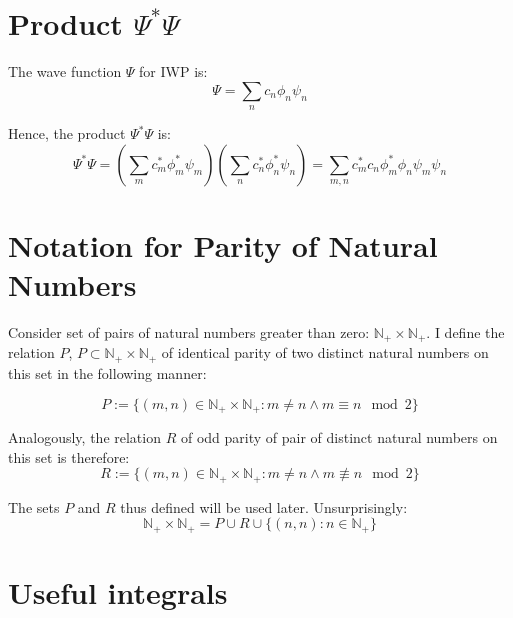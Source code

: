 \documentclass[12pt]{article}
\begin{document}
\section{Product $\Psi^* \Psi$}
The wave function $\Psi$ for IWP is:
\begin{equation*}
\Psi = \sum_n c_n \phi_n \psi_n
\end{equation*}

\noindent Hence, the product $\Psi^* \Psi$ is:
\begin{equation}
\label{qm_density_inf_sum}
\Psi^{*} \Psi = \left( 
	\sum_m c_m^* \phi_m^* \psi_m
\right) \left(
	\sum_n c_n^* \phi_n^* \psi_n
\right) = \sum_{m, n} c_m^* c_n \phi_m^* \phi_n \psi_m \psi_n
\end{equation}

\section{Notation for Parity of Natural Numbers}
Consider set of pairs of natural numbers greater than zero: $ \mathbb{N}_+ \times \mathbb{N}_+ $. I define the relation $P$, 
$P \subset \mathbb{N}_+ \times \mathbb{N}_+$ of identical parity of two distinct natural numbers on this set in the following manner:

\begin{equation}
P := \lbrace
(m, n) \in \mathbb{N}_+ \times \mathbb{N}_+: m \neq n \land m \equiv n \mod 2 
\rbrace
\end{equation}

\noindent Analogously, the relation $R$ of odd parity of pair of distinct natural numbers on this set is therefore:
\begin{equation}
R := \lbrace
(m, n) \in \mathbb{N}_+ \times \mathbb{N}_+: m \neq n \land m \not\equiv n \mod 2 
\rbrace
\end{equation}

\noindent The sets $P$ and $R$ thus defined will be used later. Unsurprisingly:
\begin{equation*}
\mathbb{N}_+ \times \mathbb{N}_+ = P \cup R \cup \lbrace
(n, n): n \in \mathbb{N}_+
\rbrace
\end{equation*}


\section{Useful integrals}
\end{document}
